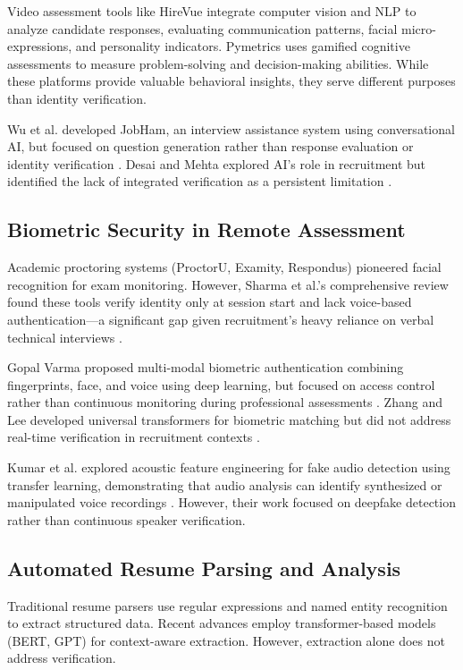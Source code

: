 \documentclass[conference]{IEEEtran}
\begin{document}
Video assessment tools like HireVue integrate computer vision and NLP to analyze candidate responses, evaluating communication patterns, facial micro-expressions, and personality indicators. Pymetrics uses gamified cognitive assessments to measure problem-solving and decision-making abilities. While these platforms provide valuable behavioral insights, they serve different purposes than identity verification.

Wu et al. developed JobHam, an interview assistance system using conversational AI, but focused on question generation rather than response evaluation or identity verification \cite{wu2023jobham}. Desai and Mehta explored AI's role in recruitment but identified the lack of integrated verification as a persistent limitation \cite{desai2021impact}.

\subsection{Biometric Security in Remote Assessment}

Academic proctoring systems (ProctorU, Examity, Respondus) pioneered facial recognition for exam monitoring. However, Sharma et al.'s comprehensive review found these tools verify identity only at session start and lack voice-based authentication—a significant gap given recruitment's heavy reliance on verbal technical interviews \cite{sharma2023multimodal}.

Gopal Varma proposed multi-modal biometric authentication combining fingerprints, face, and voice using deep learning, but focused on access control rather than continuous monitoring during professional assessments \cite{varma2025multimodal}. Zhang and Lee developed universal transformers for biometric matching but did not address real-time verification in recruitment contexts \cite{zhang2023universal}.

Kumar et al. explored acoustic feature engineering for fake audio detection using transfer learning, demonstrating that audio analysis can identify synthesized or manipulated voice recordings \cite{kumar2022novel}. However, their work focused on deepfake detection rather than continuous speaker verification.

\subsection{Automated Resume Parsing and Analysis}

Traditional resume parsers use regular expressions and named entity recognition to extract structured data. Recent advances employ transformer-based models (BERT, GPT) for context-aware extraction. However, extraction alone does not address verification.
\end{document}
